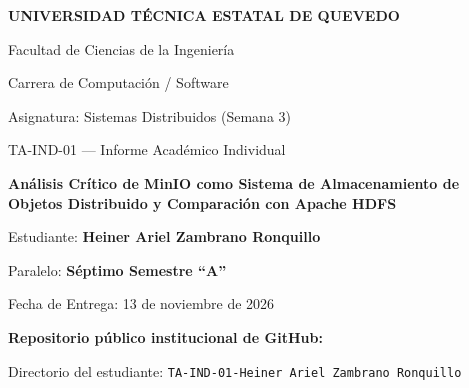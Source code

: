 \documentclass[12pt,a4paper]{article}
\begin{document}
\hypersetup{pageanchor=false}

\begin{titlepage}
    \centering
    {\Large\bfseries UNIVERSIDAD TÉCNICA ESTATAL DE QUEVEDO\par}
    \vspace{0.8cm}
    {\large Facultad de Ciencias de la Ingeniería\par}
    {\large Carrera de Computación / Software\par}
    \vspace{1.8cm}
    {\large Asignatura: Sistemas Distribuidos (Semana 3)\par}
    {\large TA-IND-01 — Informe Académico Individual\par}
    \vspace{1.5cm}
    {\LARGE\bfseries Análisis Crítico de MinIO como Sistema de Almacenamiento de Objetos Distribuido y Comparación con Apache HDFS\par}
    \vspace{2cm}
    {\large Estudiante: \textbf{Heiner Ariel Zambrano Ronquillo}\par}
    {\large Paralelo: \textbf{Séptimo Semestre ``A''}\par}
    {\large Fecha de Entrega: 13 de noviembre de 2026\par}
    \vfill
    {\small\bfseries Repositorio público institucional de GitHub:\par}
    \vspace{2mm}
    \noindent{}\par
    \vspace{2mm}
    {\small Directorio del estudiante: \texttt{TA-IND-01-Heiner Ariel Zambrano Ronquillo}\par}
\end{titlepage}

\hypersetup{pageanchor=true}

\end{document}

